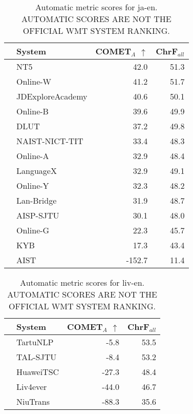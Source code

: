 \begin{table}
\centering
\caption{Automatic metric scores for ja-en. \\AUTOMATIC SCORES ARE NOT THE OFFICIAL WMT SYSTEM RANKING.}
\begin{tabular}{llrr}
\toprule
          &            System &  COMET$_{A}$ $\uparrow$ &  ChrF$_{all}$ \\
\midrule
 \Const{} &               NT5 &                    42.0 &          51.3 \\
 \Uncon{} &          Online-W &                    41.2 &          51.7 \\
 \Const{} &  JDExploreAcademy &                    40.6 &          50.1 \\
 \Uncon{} &          Online-B &                    39.6 &          49.9 \\
 \Const{} &              DLUT &                    37.2 &          49.8 \\
 \Const{} &    NAIST-NICT-TIT &                    33.4 &          48.3 \\
 \Uncon{} &          Online-A &                    32.9 &          48.4 \\
 \Uncon{} &         LanguageX &                    32.9 &          49.1 \\
 \Uncon{} &          Online-Y &                    32.3 &          48.2 \\
 \Uncon{} &        Lan-Bridge &                    31.9 &          48.7 \\
 \Const{} &         AISP-SJTU &                    30.1 &          48.0 \\
 \Uncon{} &          Online-G &                    22.3 &          45.7 \\
 \Const{} &               KYB &                    17.3 &          43.4 \\
 \Uncon{} &              AIST &                  -152.7 &          11.4 \\
\bottomrule
\end{tabular}
\end{table}



\begin{table}
\centering
\caption{Automatic metric scores for liv-en. \\AUTOMATIC SCORES ARE NOT THE OFFICIAL WMT SYSTEM RANKING.}
\begin{tabular}{llrr}
\toprule
          &     System &  COMET$_{A}$ $\uparrow$ &  ChrF$_{all}$ \\
\midrule
 \Uncon{} &   TartuNLP &                    -5.8 &          53.5 \\
 \Uncon{} &   TAL-SJTU &                    -8.4 &          53.2 \\
 \Uncon{} &  HuaweiTSC &                   -27.3 &          48.4 \\
 \Uncon{} &   Liv4ever &                   -44.0 &          46.7 \\
 \Const{} &   NiuTrans &                   -88.3 &          35.6 \\
\bottomrule
\end{tabular}
\end{table}



